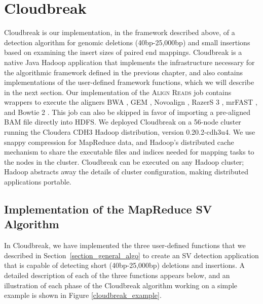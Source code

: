 \chapter{Cloudbreak}\label{chap_cloudbreak_impl}

Cloudbreak is our implementation, in the framework described above, of a detection algorithm for genomic deletions (40bp-25,000bp) and small insertions based on examining the insert sizes of paired end mappings. Cloudbreak is a native Java Hadoop application that implements the infrastructure necessary for the algorithmic framework defined in the previous chapter, and also contains implementations of the user-defined framework functions, which we will describe in the next section. Our implementation of the \textsc{Align Reads} job contains wrappers to execute the aligners BWA \cite{Li:2009p836}, GEM \cite{MarcoSola:2012hm}, Novoalign \cite{novoalign}, RazerS 3 \cite{Weese:2012by}, mrFAST \cite{Alkan:2009cr}, and Bowtie 2 \cite{Langmead:2012jh}. This job can also be skipped in favor of importing a pre-aligned BAM file directly into HDFS. We deployed Cloudbreak on a 56-node cluster running the Cloudera CDH3 Hadoop distribution, version 0.20.2-cdh3u4. We use snappy compression for MapReduce data, and Hadoop's distributed cache mechanism to share the executable files and indices needed for mapping tasks to the nodes in the cluster. Cloudbreak can be executed on any Hadoop cluster; Hadoop abstracts away the details of cluster configuration, making distributed applications portable. 

\section{Implementation of the MapReduce SV Algorithm}

In Cloudbreak, we have implemented the three user-defined functions that we described in Section~\ref{section_general_algo} to create an SV detection application that is capable of detecting short (40bp-25,000bp) deletions and insertions. A detailed description of each of the three functions appears below, and an illustration of each phase of the Cloudbreak algorithm working on a simple example is shown in Figure \ref{cloudbreak_example}.


